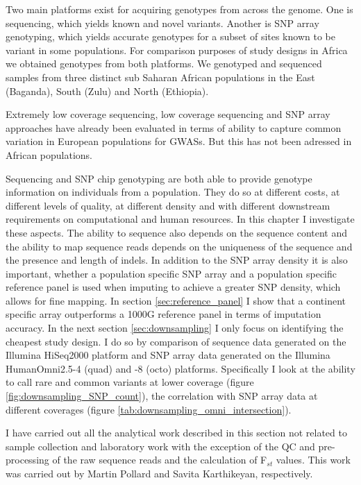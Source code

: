 Two main platforms exist for acquiring genotypes from across the genome. One is sequencing, which yields known and novel variants. Another is SNP array genotyping, which yields accurate genotypes for a subset of sites known to be variant in some populations. For comparison purposes of study designs in Africa we obtained genotypes from both platforms. We genotyped and sequenced samples from three distinct sub Saharan African populations in the East (Baganda), South (Zulu) and North (Ethiopia).

Extremely low coverage sequencing, low coverage sequencing and SNP array approaches have already been evaluated in terms of ability to capture common variation in European populations for \glspl{GWAS}.\cite{Pasaniuc2012}\cite{10.1371/journal.pcbi.1002604} But this has not been adressed in African populations.

Sequencing and \gls{SNP} chip genotyping are both able to provide genotype information on individuals from a population. They do so at different costs, at different levels of quality, at different density and with different downstream requirements on computational and human resources. In this chapter I investigate these aspects. The ability to sequence also depends on the sequence content and the ability to map sequence reads depends on the uniqueness of the sequence and the presence and length of indels. In addition to the \gls{SNP} array density it is also important, whether a population specific \gls{SNP} array and a population specific reference panel is used when imputing to achieve a greater SNP density, which allows for fine mapping. In section \ref{sec:reference_panel} I show that a continent specific array outperforms a 1000G reference panel in terms of imputation accuracy. In the next section \ref{sec:downsampling} I only focus on identifying the cheapest study design. I do so by comparison of sequence data generated on the Illumina HiSeq2000 platform and SNP array data generated on the Illumina HumanOmni2.5-4 (quad) and -8 (octo) platforms. Specifically I look at the ability to call rare and common variants at lower coverage (figure \ref{fig:downsampling_SNP_count}), the correlation with SNP array data at different coverages (figure \ref{tab:downsampling_omni_intersection}).

I have carried out all the analytical work described in this section not related to sample collection and laboratory work with the exception of the QC and pre-processing of the raw sequence reads and the calculation of F$_{st}$ values. This work was carried out by Martin Pollard and Savita Karthikeyan, respectively.

